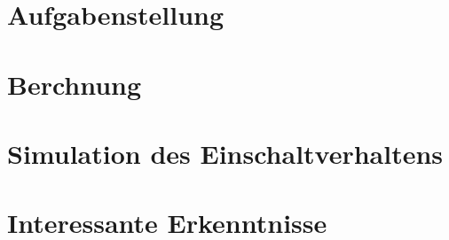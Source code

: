 \documentclass[11pt,a4paper,fleqn]{scrartcl}
\begin{document}
\Titelseite
\ifindex\else\tableofcontents\newpage\fi

\section{Aufgabenstellung}


\section{Berchnung}

\section{Simulation des Einschaltverhaltens}

\section{Interessante Erkenntnisse}
\end{document}
